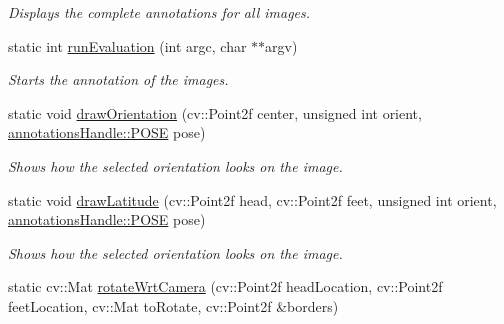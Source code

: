 \begin{DoxyCompactItemize}
\begin{DoxyCompactList}\small\item\em Displays the complete annotations for all images. \item\end{DoxyCompactList}\item 
static int \hyperlink{classannotationsHandle_ac3568b677d066530fd771952492293c3}{runEvaluation} (int argc, char $\ast$$\ast$argv)
\begin{DoxyCompactList}\small\item\em Starts the annotation of the images. \item\end{DoxyCompactList}\item 
\hypertarget{classannotationsHandle_ad00ab307a36b0ff04d1a16ea9d70f235}{
static void \hyperlink{classannotationsHandle_ad00ab307a36b0ff04d1a16ea9d70f235}{drawOrientation} (cv::Point2f center, unsigned int orient, \hyperlink{classannotationsHandle_a7a9e324ff6c85eeb2c2bd91b2b8cbdba}{annotationsHandle::POSE} pose)}
\label{classannotationsHandle_ad00ab307a36b0ff04d1a16ea9d70f235}

\begin{DoxyCompactList}\small\item\em Shows how the selected orientation looks on the image. \item\end{DoxyCompactList}\item 
\hypertarget{classannotationsHandle_a47d6eef7b70c82f473ca472e579e0b9c}{
static void \hyperlink{classannotationsHandle_a47d6eef7b70c82f473ca472e579e0b9c}{drawLatitude} (cv::Point2f head, cv::Point2f feet, unsigned int orient, \hyperlink{classannotationsHandle_a7a9e324ff6c85eeb2c2bd91b2b8cbdba}{annotationsHandle::POSE} pose)}
\label{classannotationsHandle_a47d6eef7b70c82f473ca472e579e0b9c}

\begin{DoxyCompactList}\small\item\em Shows how the selected orientation looks on the image. \item\end{DoxyCompactList}\item 
\hypertarget{classannotationsHandle_a4ce3161037c8bccdac59afcd4b6aa57a}{
static cv::Mat \hyperlink{classannotationsHandle_a4ce3161037c8bccdac59afcd4b6aa57a}{rotateWrtCamera} (cv::Point2f headLocation, cv::Point2f feetLocation, cv::Mat toRotate, cv::Point2f \&borders)}
\label{classannotationsHandle_a4ce3161037c8bccdac59afcd4b6aa57a}


\end{DoxyCompactItemize}
